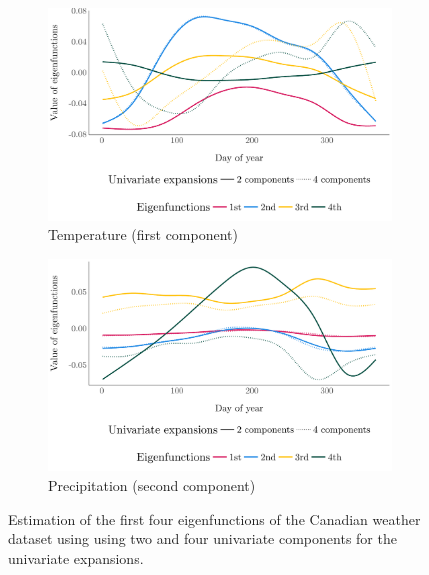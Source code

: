 \begin{figure}[!h]
     \centering
     \begin{subfigure}[b]{0.49\textwidth}
         \centering
         \includegraphics[width=1\textwidth]{figures/temperature_eigen.pdf}
         \caption{Temperature (first component)}
         \label{fig:temperature}
     \end{subfigure}
     \hfill
     \begin{subfigure}[b]{0.49\textwidth}
         \centering
         \includegraphics[width=1\textwidth]{figures/precipitation_eigen.pdf}
         \caption{Precipitation (second component)}
         \label{fig:precipitation}
     \end{subfigure}
     \caption{Estimation of the first four eigenfunctions of the Canadian weather dataset using using two and four univariate components for the univariate expansions.}
     \label{fig:eigenfunctions_weather}
\end{figure}

